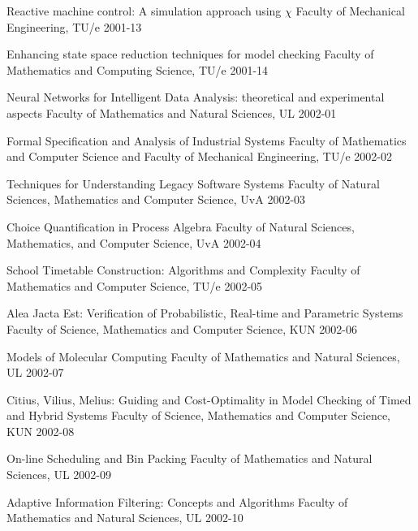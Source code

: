 \begin{multicols}{2}
         {Reactive machine control: A simulation approach using $\chi$}
         {Faculty of Mechanical Engineering, TU/e}
         {2001-13} 
     
           {Enhancing state space reduction techniques for model checking}
           {Faculty of Mathematics and Computing Science, TU/e}
           {2001-14}

         {Neural Networks for Intelligent Data Analysis: theoretical and
	  experimental aspects}
         {Faculty of Mathematics and Natural Sciences, UL}
         {2002-01}

         {Formal Specification and Analysis of Industrial Systems}
         {Faculty of Mathematics and Computer Science and Faculty of Mechanical Engineering, TU/e}
         {2002-02}

         {Techniques for Understanding Legacy Software Systems}
         {Faculty of Natural Sciences, Mathematics and Computer
          Science, UvA}
         {2002-03}
      
         {Choice Quantification in Process Algebra}
         {Faculty of Natural Sciences, Mathematics, and Computer Science, UvA}
         {2002-04}   
      
         {School Timetable Construction: Algorithms and Complexity}
         {Faculty of Mathematics and Computer Science, TU/e}
         {2002-05}

         {Alea Jacta Est: Verification of Probabilistic, Real-time and Parametric Systems}
         {Faculty of Science, Mathematics and Computer Science, KUN}
         {2002-06}

	 {Models of Molecular Computing}
         {Faculty of Mathematics and Natural Sciences, UL}
         {2002-07}

         {Citius, Vilius, Melius: Guiding and Cost-Optimality in Model Checking of Timed and Hybrid Systems}
         {Faculty of Science, Mathematics and Computer Science, KUN}
         {2002-08}

         {On-line Scheduling and Bin Packing}
         {Faculty of Mathematics and Natural Sciences, UL}
         {2002-09}


	 {Adaptive Information Filtering: Concepts and Algorithms}
         {Faculty of Mathematics and Natural Sciences, UL}
         {2002-10}


\end{multicols}
